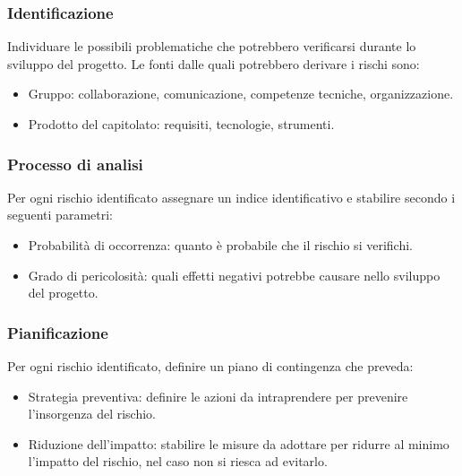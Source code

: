 \documentclass{article}
\begin{document}
\subsubsection{Identificazione}
Individuare le possibili problematiche che potrebbero verificarsi durante lo sviluppo del progetto. 
Le fonti dalle quali potrebbero derivare i rischi sono: 
\begin{itemize}
    \item Gruppo: collaborazione, comunicazione, competenze tecniche, organizzazione.
    \item Prodotto del capitolato: requisiti, tecnologie, strumenti.
\end{itemize}

\subsubsection{Processo di analisi}
Per ogni rischio identificato assegnare un indice identificativo e stabilire secondo i seguenti parametri:
\begin{itemize}
    \item Probabilità di occorrenza: quanto è probabile che il rischio si verifichi.
    \item Grado di pericolosità: quali effetti negativi potrebbe causare nello sviluppo del progetto.
\end{itemize}

\subsubsection{Pianificazione}
Per ogni rischio identificato, definire un piano di contingenza che preveda:
\begin{itemize}
    \item Strategia preventiva: definire le azioni da intraprendere per prevenire l’insorgenza del rischio.
    \item Riduzione dell'impatto: stabilire le misure da adottare per ridurre al minimo l'impatto del rischio, nel caso non si riesca ad evitarlo.
\end{itemize}

\end{document}
